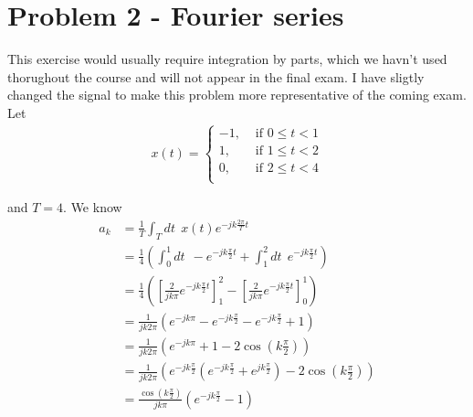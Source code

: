 \section*{Problem 2 - Fourier series}
This exercise would usually require integration by parts, which we havn't used 
thorughout the course and will not appear in the final exam. I have sligtly 
changed the signal to make this problem more representative of the coming exam.
Let 
\begin{align}
    x(t) = \begin{cases}
        -1, &\text{ if }0\leq t < 1\\
        1, &\text{ if }1\leq t < 2\\
        0, &\text{ if }2\leq t < 4\\        
    \end{cases}
\end{align}

and $T = 4$. We know 
\begin{align}
    a_k &= \frac{1}{T}\int_T dt \ \ x(t)e^{-jk\frac{2\pi}{T}t}\\
        &= \frac{1}{4} \left(\int_0^1 dt \ \ - e^{-jk\frac{\pi}{2}t} 
            + \int_1^2 dt \ \ e^{-jk\frac{\pi}{2}t}\right)\\
        &= \frac{1}{4}\left(\left[\frac{2}{jk\pi} e^{-jk\frac{\pi}{2}t}\right]
        _1^2
        -\left[\frac{2}{jk\pi} e^{-jk\frac{\pi}{2}t}\right]_0^1\right)\\
        &= \frac{1}{jk2\pi}\left( e^{-jk\pi} - e^{-jk\frac{\pi}{2}}
        - e^{-jk\frac{\pi}{2}} + 1\right)\\
        &= \frac{1}{jk2\pi} 
            \left(e^{-jk\pi} + 1 -2\cos(k \frac{\pi}{2})\right)\\
        &= \frac{1}{jk2\pi} \left(e^{-jk \frac{\pi}{2}}
            \left(e^{-jk \frac{\pi}{2}} + e^{jk \frac{\pi}{2}}\right)
        - 2\cos(k\frac{\pi}{2}) \right)\\
        &= \frac{\cos(k\frac{\pi}{2})}{jk\pi} 
            \left(e^{-jk \frac{\pi}{2}} - 1 \right)
\end{align}
